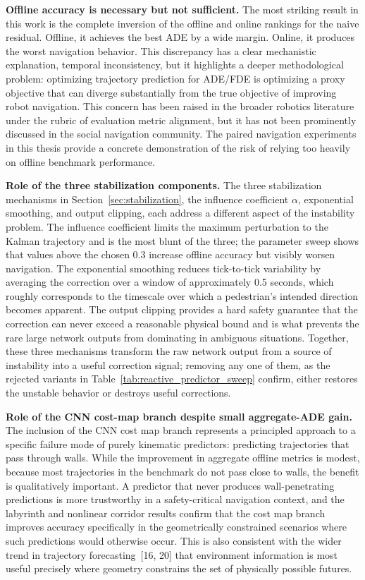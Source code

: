 \documentclass[12pt, a4paper]{article}
\begin{document}
\textbf{Offline accuracy is necessary but not sufficient.} The most striking result in this work is the complete inversion of the offline and online rankings for the naive residual. Offline, it achieves the best ADE by a wide margin. Online, it produces the worst navigation behavior. This discrepancy has a clear mechanistic explanation, temporal inconsistency, but it highlights a deeper methodological problem: optimizing trajectory prediction for ADE/FDE is optimizing a proxy objective that can diverge substantially from the true objective of improving robot navigation. This concern has been raised in the broader robotics literature under the rubric of evaluation metric alignment, but it has not been prominently discussed in the social navigation community. The paired navigation experiments in this thesis provide a concrete demonstration of the risk of relying too heavily on offline benchmark performance.

\textbf{Role of the three stabilization components.} The three stabilization mechanisms in Section~\ref{sec:stabilization}, the influence coefficient $\alpha$, exponential smoothing, and output clipping, each address a different aspect of the instability problem. The influence coefficient limits the maximum perturbation to the Kalman trajectory and is the most blunt of the three; the parameter sweep shows that values above the chosen $0.3$ increase offline accuracy but visibly worsen navigation. The exponential smoothing reduces tick-to-tick variability by averaging the correction over a window of approximately 0.5 seconds, which roughly corresponds to the timescale over which a pedestrian's intended direction becomes apparent. The output clipping provides a hard safety guarantee that the correction can never exceed a reasonable physical bound and is what prevents the rare large network outputs from dominating in ambiguous situations. Together, these three mechanisms transform the raw network output from a source of instability into a useful correction signal; removing any one of them, as the rejected variants in Table~\ref{tab:reactive_predictor_sweep} confirm, either restores the unstable behavior or destroys useful corrections.

\textbf{Role of the CNN cost-map branch despite small aggregate-ADE gain.} The inclusion of the CNN cost map branch represents a principled approach to a specific failure mode of purely kinematic predictors: predicting trajectories that pass through walls. While the improvement in aggregate offline metrics is modest, because most trajectories in the benchmark do not pass close to walls, the benefit is qualitatively important. A predictor that never produces wall-penetrating predictions is more trustworthy in a safety-critical navigation context, and the labyrinth and nonlinear corridor results confirm that the cost map branch improves accuracy specifically in the geometrically constrained scenarios where such predictions would otherwise occur. This is also consistent with the wider trend in trajectory forecasting~[16, 20] that environment information is most useful precisely where geometry constrains the set of physically possible futures.
\end{document}
